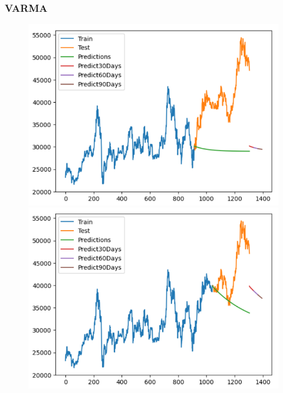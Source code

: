 \subsubsection{VARMA}
\begin{figure}[H]
    \centering
    \begin{minipage}{0.15\textwidth}
    \centering
    \includegraphics[width=1\textwidth]{resources/chapter-5/newdata1/result/BIDV_VARMA_7-3.png}
    \end{minipage}
    \hfill
    \begin{minipage}{0.15\textwidth}
    \centering
    \includegraphics[width=1\textwidth]{resources/chapter-5/newdata1/result/BIDV_VARMA_8-2.png}
    \end{minipage}
    \hfill
        \begin{minipage}{0.15\textwidth}

\end{minipage}
\end{figure}
